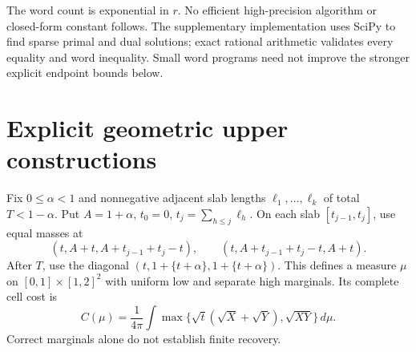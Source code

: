 \documentclass[11pt]{article}
\theoremstyle{definition}\newtheorem{definition}[theorem]{Definition}
\theoremstyle{remark}\newtheorem{remark}[theorem]{Remark}
\begin{document}
The word count is exponential in $r$. No efficient high-precision
algorithm or closed-form constant follows. The supplementary implementation
uses SciPy to find sparse primal and dual solutions; exact rational
arithmetic validates every equality and word inequality. Small word programs
need not improve the stronger explicit endpoint bounds below.

\section{Explicit geometric upper constructions}\label{sec:upper}

Fix $0\le\alpha<1$ and nonnegative adjacent slab lengths
$\ell_1,\ldots,\ell_k$ of total $T<1-\alpha$. Put $A=1+\alpha$,
$t_0=0$, $t_j=\sum_{h\le j}\ell_h$. On each slab
$[t_{j-1},t_j]$, use equal masses at
\[
 (t,A+t,A+t_{j-1}+t_j-t),\qquad
 (t,A+t_{j-1}+t_j-t,A+t).
\]
After $T$, use the diagonal $(t,1+\{t+\alpha\},1+\{t+\alpha\})$.
This defines a measure $\mu$ on $[0,1]\times[1,2]^2$ with uniform low
and separate high marginals. Its complete cell cost is
\begin{equation}\label{eq:blockcost}
 C(\mu)=\frac1{4\pi}\int
 \max\{\sqrt t(\sqrt X+\sqrt Y),\sqrt{XY}\}\,d\mu.
\end{equation}
Correct marginals alone do not establish finite recovery.
\end{document}

